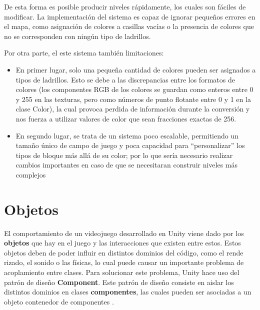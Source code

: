 De esta forma es posible producir niveles rápidamente, los cuales son fáciles de modificar. La implementación del sistema es capaz de ignorar pequeños errores en el mapa, como asignación de colores a casillas vacías o la presencia de colores que no se corresponden con ningún tipo de ladrillos.

Por otra parte, el este sistema también limitaciones:
\begin{itemize}
  \item En primer lugar, solo una pequeña cantidad de colores pueden ser asignados a tipos de ladrillos. Esto se debe a las discrepancias entre los formatos de colores (los componentes RGB de los colores se guardan como enteros entre 0 y 255 en las texturas, pero como números de punto flotante entre 0 y 1 en la clase Color), la cual provoca perdida de información durante la conversión y nos fuerza a utilizar valores de color que sean fracciones exactas de 256. 
  \item En segundo lugar, se trata de un sistema poco escalable, permitiendo un tamaño único de campo de juego y poca capacidad para ``personalizar'' los tipos de bloque más allá de su color; por lo que sería necesario realizar cambios importantes en caso de que se necesitaran construir niveles más complejos
\end{itemize}

\section{Objetos}
El comportamiento de un videojuego desarrollado en Unity viene dado por los \textbf{objetos} que hay en el juego y las interacciones que existen entre estos. Estos objetos deben de poder influir en distintos dominios del código, como el rende rizado, el sonido o las físicas, lo cual puede causar un importante problema de acoplamiento entre clases. Para solucionar este problema, Unity hace uso del patrón de diseño \textbf{Component}. Este patrón de diseño  
consiste en aislar los distintos dominios en clases \textbf{componentes}, las cuales pueden ser asociadas a un objeto contenedor de componentes \cite{game_programming_patterns}.

